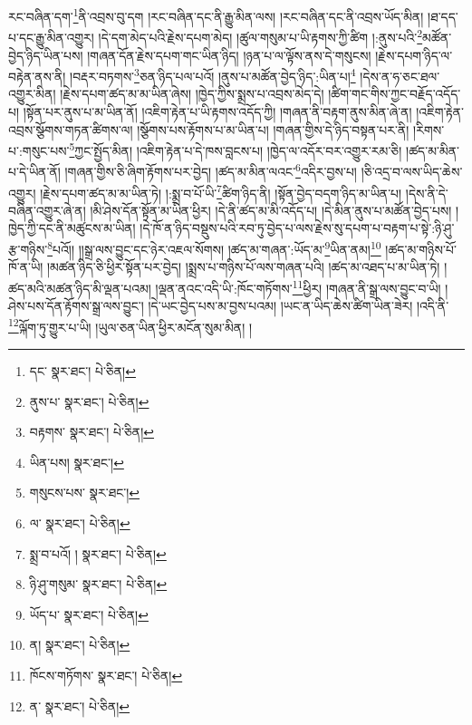 རང་བཞིན་དག་\footnote{དང་  སྣར་ཐང་།  པེ་ཅིན། }ནི་འབྲས་བུ་དག །རང་བཞིན་དང་ནི་རྒྱུ་མིན་ལས། །རང་བཞིན་དང་ནི་འབྲས་ཡོད་མིན། །ཐ་དད་པ་དང་རྒྱུ་མིན་འགྱུར། །དེ་དག་མེད་པའི་རྗེས་དཔག་མེད། །ཚུལ་གསུམ་པ་ཡི་རྟགས་ཀྱི་ཚིག །:ནུས་པའི་\footnote{ནུས་པ་  སྣར་ཐང་།  པེ་ཅིན། }མཚོན་བྱེད་ཉིད་ཡིན་པས། །གཞན་དོན་རྗེས་དཔག་གང་ཡིན་ཉིད། །ཉན་པ་ལ་ལྟོས་ནས་དེ་གསུངས། །རྗེས་དཔག་ཉིད་ལ་བརྟེན་ནས་ནི། །བརྡར་བཏགས་\footnote{བརྟགས་  སྣར་ཐང་།  པེ་ཅིན། }ཅན་ཉིད་པལ་པའོ། །ནུས་པ་མཚོན་བྱེད་ཉིད་:ཡིན་པ།\footnote{ཡིན་པས།  སྣར་ཐང་། } །དེས་ན་ཧ་ཅང་ཐལ་འགྱུར་མིན། །རྗེས་དཔག་ཚད་མ་མ་ཡིན་ཞེས། །ཁྱེད་ཀྱིས་སྨྲས་པ་འབྲས་མེད་དེ། །ཚིག་གང་གིས་ཀྱང་བརྗོད་འདོད་པ། །སྟོན་པར་ནུས་པ་མ་ཡིན་ནོ། །འཇིག་རྟེན་པ་ཡི་རྟགས་འདོད་ཀྱི། །གཞན་ནི་བརྟག་ནུས་མིན་ཞེ་ན། །འཇིག་རྟེན་འབྲས་སྩོགས་གཏན་ཚིགས་ལ། །སྩོགས་པས་རྟོགས་པ་མ་ཡིན་པ། །གཞན་གྱིས་དེ་ཉིད་བསྟན་པར་ནི། །རིགས་པ་:གསུང་པས་\footnote{གསུངས་པས་  སྣར་ཐང་། }ཀྱང་སྤྱོད་མིན། །འཇིག་རྟེན་པ་དེ་ཁས་བླངས་པ། །ཁྱེད་ལ་འདོར་བར་འགྱུར་རམ་ཅི། །ཚད་མ་མིན་པ་དེ་ཡིན་ནོ། །གཞན་གྱིས་ཅི་ཞིག་རྟོགས་པར་བྱེད། །ཚད་མ་མིན་ལའང་\footnote{ལ་  སྣར་ཐང་།  པེ་ཅིན། }འདིར་བྱས་པ། །ཅི་འདྲ་བ་ལས་ཡིད་ཆེས་འགྱུར། །རྗེས་དཔག་ཚད་མ་མ་ཡིན་ཏེ། །:སྨྲ་བ་པོ་ཡི་\footnote{སྨྲ་བ་པའོ། །  སྣར་ཐང་།  པེ་ཅིན། }ཚིག་ཉིད་ནི། །སྟོན་བྱེད་བདག་ཉིད་མ་ཡིན་པ། །དེས་ནི་དེ་བཞིན་འགྱུར་ཞེ་ན། །མི་ཤེས་དོན་སྟོན་མ་ཡིན་ཕྱིར། །དེ་ནི་ཚད་མ་མི་འདོད་པ། །དེ་མིན་ནུས་པ་མཚོན་བྱེད་པས། །ཁྱེད་ཀྱི་དང་ནི་མཚུངས་མ་ཡིན། །དེ་ཁོ་ན་ཉིད་བསྡུས་པའི་རབ་ཏུ་བྱེད་པ་ལས་རྗེས་སུ་དཔག་པ་བརྟག་པ་སྟེ་:ཉི་ཤུ་རྩ་གཉིས་\footnote{ཉི་ཤུ་གསུམ་  སྣར་ཐང་།  པེ་ཅིན། }པའོ།། །།སྒྲ་ལས་བྱུང་དང་ཉེར་འཇལ་སོགས། །ཚད་མ་གཞན་:ཡོད་མ་\footnote{ཡོད་པ་  སྣར་ཐང་།  པེ་ཅིན། }ཡིན་ནམ།\footnote{ན།  སྣར་ཐང་།  པེ་ཅིན། } །ཚད་མ་གཉིས་པོ་ཁོ་ན་ཡི། །མཚན་ཉིད་ཅི་ཕྱིར་སྟོན་པར་བྱེད། །སྨྲས་པ་གཉིས་པོ་ལས་གཞན་པའི། །ཚད་མ་འཐད་པ་མ་ཡིན་ཏེ། །ཚད་མའི་མཚན་ཉིད་མི་ལྡན་པའམ། །ལྡན་ནའང་འདི་ཡི་:ཁོང་གཏོགས་\footnote{ཁོངས་གཏོགས་  སྣར་ཐང་།  པེ་ཅིན། }ཕྱིར། །གཞན་ནི་སྒྲ་ལས་བྱུང་བ་ཡི། །ཤེས་པས་དོན་རྟོགས་སྒྲ་ལས་བྱུང་། །དེ་ཡང་བྱེད་པས་མ་བྱས་པའམ། །ཡང་ན་ཡིད་ཆེས་ཚིག་ཡིན་ཟེར། །འདི་ནི་\footnote{ན་  སྣར་ཐང་།  པེ་ཅིན། }ལྐོག་ཏུ་གྱུར་པ་ཡི། །ཡུལ་ཅན་ཡིན་ཕྱིར་མངོན་སུམ་མིན། །
